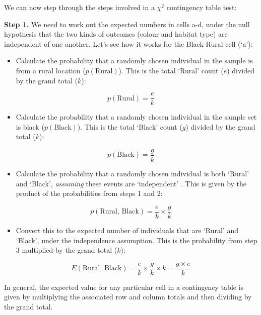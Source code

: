 \documentclass[
]{book}
\providecommand{\tightlist}{%
  \setlength{\itemsep}{0pt}\setlength{\parskip}{0pt}}
\begin{document}
We can now step through the steps involved in a \(\chi^{2}\) contingency table test:

\textbf{Step 1.} We need to work out the expected numbers in cells a-d, under the null hypothesis that the two kinds of outcomes (colour and habitat type) are independent of one another. Let's see how it works for the Black-Rural cell (`a'):

\begin{itemize}
\tightlist
\item
  Calculate the probability that a randomly chosen individual in the sample is from a rural location (\(p(\text{Rural})\)). This is the total `Rural' count (\(e\)) divided by the grand total (\(k\)):
\end{itemize}

\[p(\text{Rural}) = \frac{e}{k}\]

\begin{itemize}
\tightlist
\item
  Calculate the probability that a randomly chosen individual in the sample set is black (\(p(\text{Black})\)). This is the total `Black' count (\(g\)) divided by the grand total (\(k\)):
\end{itemize}

\[p(\text{Black}) = \frac{g}{k}\]

\begin{itemize}
\tightlist
\item
  Calculate the probability that a randomly chosen individual is both `Rural' and `Black', \emph{assuming} these events are `independent' . This is given by the product of the probabilities from steps 1 and 2:
\end{itemize}

\[p(\text{Rural, Black}) = \frac{e}{k} \times \frac{g}{k}\]

\begin{itemize}
\tightlist
\item
  Convert this to the expected number of individuals that are `Rural' and `Black', under the independence assumption. This is the probability from step 3 multiplied by the grand total (\(k\)):
\end{itemize}

\[E(\text{Rural, Black}) = \frac{e}{k} \times \frac{g}{k} \times {k} = \frac{g \times e}{k}\]

In general, the expected value for any particular cell in a contingency table is given by multiplying the associated row and column totals and then dividing by the grand total.
\end{document}
